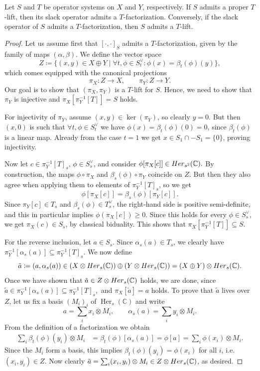 \documentclass[10pt,a4paper]{amsart}
\newcommand{\C}{\mathbb{C}}
\begin{document}
\begin{theorem} \label{thm:NC_lift_iff_fact}
	Let \(S\) and \(T\) be operator systems on \(X\) and \(Y\), respectively. If \(S\) admits a proper \(T\)-lift, then its slack operator  admits a \(T\)-factorization. Conversely, if the slack operator of $S$ admits a \(T\)-factorization, then \(S\) admits a  \(T\)-lift.
\end{theorem}

\begin{proof}
	Let us assume first that \([\cdot,\cdot]_S\) admits a \(T\)-factorization, given by the family of maps \((\alpha, \beta)\). We define the vector space \[Z \coloneqq \lbrace (x, y) \in X \oplus Y \mid \forall t, \phi \in S^\lor_t\colon \phi(x) = \beta_t(\phi)(y) \rbrace,\] which comes equipped with the canonical projections \[\pi_X\colon Z \to X, \qquad \pi_Y\colon Z \to Y.\] Our goal is to show that \((\pi_X, \pi_Y)\) is a \(T\)-lift for \(S\). Hence, we need to show that $\pi_Y$ is injective and \(\pi_X[\pi_Y^{-1}[T]] = S\) holds. 

   For injectivity of $\pi_Y$, assume \((x, y) \in \operatorname{ker}(\pi_Y)\), so clearly \(y = 0\). But then \((x, 0)\) is such that \(\forall t, \phi \in S^\lor_t\) we have \(\phi(x) = \beta_t(\phi)(0) = 0\), since \(\beta_t(\phi)\) is a linear map. Already from the case $t=1$ we get  $x\in S_1\cap -S_1=\{0\}$, proving injectivity. 
	
    Now let \(c \in \pi_Y^{-1}[T]_s\), \(\phi \in S^\lor_s\), and consider \(\phi[\pi_X[c]]\in{\rm Her}_{s^2}(\C).\) By construction, the maps \(\phi \circ \pi_X\) and \(\beta_s(\phi) \circ \pi_Y\) coincide on \(Z\). But then they  also agree when applying them to elements of \(\pi_Y^{-1}[T]_s\), so we get \[\phi[\pi_X[c]] = \beta_s(\phi)[\pi_Y[c]].\] Since \(\pi_Y[c] \in T_s\) and \(\beta_s(\phi) \in T^\lor_s\), the right-hand side is positive semi-definite, and this in particular implies  $\phi(\pi_X[c])\geqslant 0.$ Since this holds for every \(\phi \in S^\lor_s\), we get $\pi_X(c)\in S_s$, by classical biduality. This shows that \(\pi_X[\pi_Y^{-1}[T]] \subseteq S\).
	
	For the reverse inclusion, let \(a \in S_s\). Since \(\alpha_s(a) \in T_s\), we clearly have $\pi_Y^{-1}[\alpha_s(a)] \subseteq \pi_Y^{-1}[T]_s.$ We now define $$\tilde{a} \coloneqq (a, \alpha_s(a))\in (X\otimes{\rm Her}_s(\C))\oplus(Y\otimes{\rm Her}_s(\C))=(X\oplus Y)\otimes{\rm Her}_s(\C).$$ Once we have shown that $\tilde a\in Z\otimes{\rm Her}_s(\C)$ holds, we are done, since  \(\tilde{a} \in \pi_Y^{-1}[\alpha_s(a)]\subseteq \pi_Y^{-1}[T]_s,\) and $\pi_X[\tilde a]=a$ holds. To prove that $\tilde a$ lives over $Z$, let us fix a basis \((M_i)_i\) of \(\operatorname{Her}_s(\C)\) and write \[a = \sum_i x_i \otimes M_i, \qquad \alpha_s(a) = \sum_i y_i \otimes M_i.\]  From the definition of a factorization we obtain \begin{align*}\sum_i\beta_t(\phi)(y_i)\otimes M_i&=\beta_t(\phi)[\alpha_s(a)]=\phi[a]=\sum_i\phi(x_i)\otimes M_i.\end{align*} Since the $M_i$ form a basis, this implies $\beta_t(\phi)(y_i)=\phi(x_i)$ for all $i$, i.e.\ $(x_i,y_i)\in Z.$ Now clearly $\tilde a=\sum_i (x_i,y_i)\otimes M_i\in Z\otimes{\rm Her}_s(\C)$, as desired.
	

\end{proof}
\end{document}
